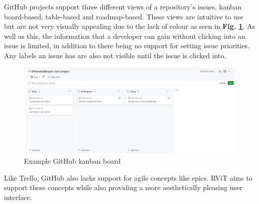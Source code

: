 \documentclass[l4proj.tex]{subfiles}
\begin{document}
GitHub projects support three different views of a repository's issues, kanban board-based, table-based and roadmap-based. These views are intuitive to use but are not very visually appealing due to the lack of colour as seen in \textbf{Fig. \ref{fig:GitHub kanban}}. As well as this, the information that a developer can gain without clicking into an issue is limited, in addition to there being no support for setting issue priorities. Any labels an issue has are also not visible until the issue is clicked into.


\begin{figure}[h!]
\begin{center}
\includegraphics[scale=0.32]{dissertation/images/GitHubKanbanBoard.png}
\caption{Example GitHub kanban board}
\label{fig:GitHub kanban} 
\end{center}
\end{figure}


Like Trello, GitHub also lacks support for agile concepts like epics. RViT aims to support these concepts while also providing a more aesthetically pleasing user interface. 
\end{document}
